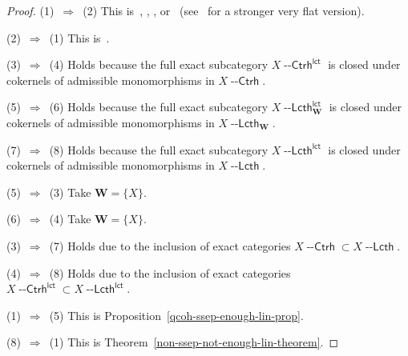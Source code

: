 \documentclass[12pt,a4paper]{amsart}
\newcommand{\+}{\nobreakdash-}
\renewcommand{\:}{\colon}
\newcommand{\Ctrh}{{\operatorname{\mathsf{--Ctrh}}}}
\newcommand{\Lcth}{{\operatorname{\mathsf{--Lcth}}}}
\newcommand{\lct}{\mathsf{lct}}
\newcommand{\bW}{\mathbf W}
\theoremstyle{plain}
\theoremstyle{definition}
\begin{document}
\begin{proof}
 (1)~$\Longrightarrow$~(2) This is~\cite[Section~2.4]{M-n},
\cite[Section~3.2]{M-th}, \cite[Lemma~A.1]{EP},
or~\cite[Lemma~4.1.8 or Corollary~4.1.11(a)]{Pcosh}
(see~\cite[Lemma~4.1.1 or Corollary~4.1.4(a)]{Pcosh} for
a stronger very flat version).

 (2)~$\Longrightarrow$~(1) This is~\cite[Theorem~2.2]{SS}.

 (3)~$\Longrightarrow$~(4) Holds because the full exact subcategory
$X\Ctrh^\lct$ is closed under cokernels of admissible monomorphisms
in $X\Ctrh$.

 (5)~$\Longrightarrow$~(6) Holds because the full exact subcategory
$X\Lcth^\lct_\bW$ is closed under cokernels of admissible monomorphisms
in $X\Lcth_\bW$.

 (7)~$\Longrightarrow$~(8) Holds because the full exact subcategory
$X\Lcth^\lct$ is closed under cokernels of admissible monomorphisms
in $X\Lcth$.

 (5)~$\Longrightarrow$~(3) Take $\bW=\{X\}$.
 
 (6)~$\Longrightarrow$~(4) Take $\bW=\{X\}$.
 
 (3)~$\Longrightarrow$~(7) Holds due to the inclusion of exact
categories $X\Ctrh\subset X\Lcth$.

 (4)~$\Longrightarrow$~(8) Holds due to the inclusion of exact
categories $X\Ctrh^\lct\subset X\Lcth^\lct$.

 (1)~$\Longrightarrow$~(5) This is
Proposition~\ref{qcoh-ssep-enough-lin-prop}.

 (8)~$\Longrightarrow$~(1) This is
Theorem~\ref{non-ssep-not-enough-lin-theorem}.
\end{proof}
\end{document}
